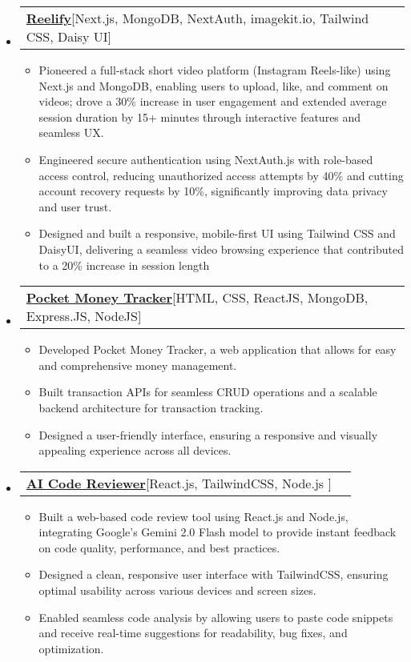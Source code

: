 \documentclass[letterpaper,10pt]{article}
\makeatletter
\newcommand{\resumeItem}[1]{
    \item\small{
      {#1 \vspace{-2pt}}
    }
  }
\newcommand{\resumeProjectHeading}[2]{
      \item
      \begin{tabular*}{0.97\textwidth}{l@{\extracolsep{\fill}}r}
        \small#1 & #2 \\
      \end{tabular*}\vspace{-7pt}
  }
\newcommand{\resumeSubHeadingListStart}{\begin{itemize}[leftmargin=0.15in, label={}]}
\newcommand{\resumeSubHeadingListEnd}{\end{itemize}}
\newcommand{\resumeItemListStart}{\begin{itemize}}
\newcommand{\resumeItemListEnd}{\end{itemize}\vspace{-5pt}}
\makeatother
\begin{document}
\resumeSubHeadingListStart
\resumeProjectHeading
{\textbf{\href{https://github.com/shanutiwari1010/reelify}
{Reelify}\hspace{5pt}}{{[Next.js, MongoDB, NextAuth, imagekit.io, Tailwind CSS, Daisy UI]}}}{}
\resumeItemListStart
\resumeItem{Pioneered a full-stack short video platform (Instagram Reels-like) using Next.js and MongoDB, enabling users to upload, like, and comment on videos; drove a 30\% increase in user engagement and extended average session duration by 15+ minutes through interactive features and seamless UX.}
\resumeItem{Engineered secure authentication using NextAuth.js with role-based access control, reducing unauthorized access attempts by 40\% and cutting account recovery requests by 10\%, significantly improving data privacy and user trust.}
\resumeItem{Designed and built a responsive, mobile-first UI using Tailwind CSS and DaisyUI, delivering a seamless video browsing experience that contributed to a 20\% increase in session length}
\resumeItemListEnd
\resumeSubHeadingListEnd

\resumeSubHeadingListStart
\resumeProjectHeading
{\textbf{\href{https://github.com/shanutiwari1010/money-tracker-app}{Pocket Money Tracker}\hspace{5pt}}{[HTML, CSS, ReactJS, MongoDB, Express.JS, NodeJS]}}{}
\resumeItemListStart
\resumeItem{Developed Pocket Money Tracker, a web application that allows for easy and comprehensive money management.}
\resumeItem{Built transaction APIs for seamless CRUD operations and a scalable backend architecture for transaction tracking.}
\resumeItem{Designed a user-friendly interface, ensuring a responsive and visually appealing experience across all devices.}
\resumeItemListEnd
\resumeSubHeadingListEnd


\resumeSubHeadingListStart
\resumeProjectHeading
{\textbf{\href{https://github.com/shanutiwari1010/portfolio}{AI Code Reviewer}\hspace{5pt}}{{[React.js, TailwindCSS, Node.js ]}}}{}
\resumeItemListStart
\resumeItem{Built a web-based code review tool using React.js and Node.js, integrating Google's Gemini 2.0 Flash model to provide instant feedback on code quality, performance, and best practices.}
\resumeItem{Designed a clean, responsive user interface with TailwindCSS, ensuring optimal usability across various devices and screen sizes.}
\resumeItem{Enabled seamless code analysis by allowing users to paste code snippets and receive real-time suggestions for readability, bug fixes, and optimization.}
\resumeItemListEnd
\resumeSubHeadingListEnd
\end{document}
